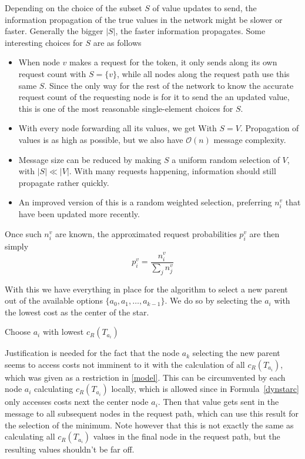 \documentclass[a4paper, oneside]{discothesis}
\begin{document}
Depending on the choice of the subset $S$ of value updates to send, the information propagation of the true values in the network might be slower or faster. Generally the bigger $|S|$, the faster information propagates. Some interesting choices for $S$ are as follows
\begin{itemize}
\item When node $v$ makes a request for the token, it only sends along its own request count with $S=\{v\}$, while all nodes along the request path use this same $S$. Since the only way for the rest of the network to know the accurate request count of the requesting node is for it to send the an updated value, this is one of the most reasonable single-element choices for $S$.
\item With every node forwarding all its values, we get With $S=V$. Propagation of values is as high as possible, but we also have $\mathcal{O}(n)$ message complexity.
\item Message size can be reduced by making $S$ a uniform random selection of $V$, with $|S|\ll|V|$. With many requests happening, information should still propagate rather quickly.
\item An improved version of this is a random weighted selection, preferring $n_i^v$ that have been updated more recently.
\end{itemize}

Once such $n_i^v$ are known, the approximated request probabilities $p_i^v$ are then simply
\begin{equation}
p_i^v=\frac{n_i^v}{\sum_jn_j^v}
\end{equation}

With this we have everything in place for the algorithm to select a new parent out of the available options $\{a_{0},a_{1},\dots,a_{k-1}\}$. We do so by selecting the $a_{i}$ with the lowest cost as the center of the star.

\begin{algorithmic}
\State\Return Choose $a_{i}$ with lowest $c_R(T_{a_{i}})$
\EndFunction
\end{algorithmic}

Justification is needed for the fact that the node $a_k$ selecting the new parent seems to access costs not imminent to it with the calculation of all $c_R(T_{a_{i}})$, which was given as a restriction in \ref{model}. This can be circumvented by each node $a_{i}$ calculating $c_R(T_{a_{i}})$ locally, which is allowed since in Formula~\ref{dynstarc} only accesses costs next the center node $a_{i}$. Then that value gets sent in the message to all subsequent nodes in the request path, which can use this result for the selection of the minimum. Note however that this is not exactly the same as calculating all $c_R(T_{a_{i}})$ values in the final node in the request path, but the resulting values shouldn't be far off.
\end{document}

